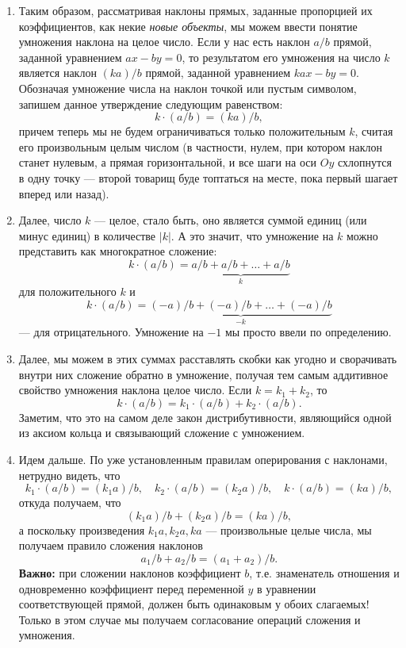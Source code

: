 \begin{enumerate}
\item Таким образом, рассматривая наклоны прямых, заданные пропорцией их коэффициентов, как некие 
\textit{новые объекты}, мы можем ввести понятие умножения наклона на целое число. Если у нас есть наклон $a/b$ прямой, заданной уравнением $ax-by=0$, то результатом его умножения на число $k$ является наклон $(ka)/b$ прямой, заданной уравнением $kax-by=0$. Обозначая умножение числа на наклон точкой или пустым символом, запишем данное утверждение следующим равенством:
$$
k\cdot(a/b) = (ka)/b,
$$
причем теперь мы не будем ограничиваться только положительным $k$, считая его произвольным целым числом (в частности, нулем, при котором наклон станет нулевым, а прямая горизонтальной, и все шаги на оси $Oy$ схлопнутся в одну точку --- второй товарищ буде топтаться на месте, пока первый шагает вперед или назад).
\item Далее, число $k$ --- целое, стало быть, оно является суммой единиц (или минус единиц) в количестве $|k|$. А это значит, что умножение на $k$ можно представить как многократное сложение:
$$
k\cdot(a/b) = \underbrace{a/b + a/b + \dots + a/b}_{k}
$$
для положительного $k$ и
$$
k\cdot(a/b) = \underbrace{(-a)/b + (-a)/b + \dots + (-a)/b}_{-k}
$$
--- для отрицательного. Умножение на $-1$ мы просто ввели по определению.

\item Далее, мы можем в этих суммах расставлять скобки как угодно и сворачивать внутри них сложение обратно в умножение, получая тем самым аддитивное свойство умножения наклона целое число. Если $k=k_1+k_2$, то
$$
k\cdot(a/b) = k_1\cdot(a/b) + k_2\cdot(a/b).
$$
Заметим, что это на самом деле закон дистрибутивности, являющийся одной из аксиом кольца и связывающий сложение с умножением.

\item Идем дальше. По уже установленным правилам оперирования с наклонами, нетрудно видеть, что
$$
k_1\cdot(a/b) = (k_1a)/b,\quad k_2\cdot(a/b) = (k_2a)/b,\quad k\cdot(a/b) = (ka)/b,
$$
откуда получаем, что
$$
(k_1a)/b + (k_2a)/b = (ka)/b,
$$
а поскольку произведения $k_1a, k_2a, ka$ --- произвольные целые числа, мы получаем правило сложения наклонов
$$
a_1/b + a_2/b = (a_1+a_2)/b.
$$
\textbf{Важно:} при сложении наклонов коэффициент $b$, т.е. знаменатель отношения и одновременно коэффициент перед переменной $y$ в уравнении соответствующей прямой, должен быть одинаковым у обоих слагаемых!
Только в этом случае мы получаем согласование операций сложения и умножения.


\end{enumerate}

